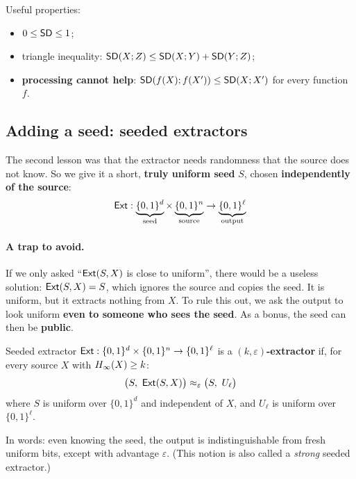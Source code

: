 Useful properties:
\begin{itemize}
  \item $0 \leq \mathsf{SD} \leq 1$;
  \item triangle inequality: $\mathsf{SD}(X; Z) \leq \mathsf{SD}(X; Y) + \mathsf{SD}(Y; Z)$;
  \item \textbf{processing cannot help}: $\mathsf{SD}(f(X); f(X')) \leq \mathsf{SD}(X; X')$ for every function $f$.
\end{itemize}

\subsection{Adding a seed: seeded extractors}\label{sec:seeded}

The second lesson was that the extractor needs randomness that the source does not know. So we give it a short, \textbf{truly uniform seed} $S$, chosen \textbf{independently of the source}:
\[
  \mathsf{Ext} : \underbrace{\{0,1\}^d}_{\text{seed}} \times \underbrace{\{0,1\}^n}_{\text{source}} \to \underbrace{\{0,1\}^\ell}_{\text{output}}
\]

\paragraph{A trap to avoid.} If we only asked ``$\mathsf{Ext}(S, X)$ is close to uniform'', there would be a useless solution: $\mathsf{Ext}(S, X) = S$, which ignores the source and copies the seed. It is uniform, but it extracts nothing from $X$. To rule this out, we ask the output to look uniform \textbf{even to someone who sees the seed}. As a bonus, the seed can then be \textbf{public}.

\begin{frameddefn}[label={def:extractor}]{Seeded extractor}
  $\mathsf{Ext} : \{0,1\}^d \times \{0,1\}^n \to \{0,1\}^\ell$ is a \textbf{$(k, \varepsilon)$-extractor} if, for every source $X$ with $H_\infty(X) \geq k$:
  \[
    \big(S,\ \mathsf{Ext}(S, X)\big) \approx_\varepsilon \big(S,\ U_\ell\big)
  \]
  where $S$ is uniform over $\{0,1\}^d$ and independent of $X$, and $U_\ell$ is uniform over $\{0,1\}^\ell$.
\end{frameddefn}

In words: even knowing the seed, the output is indistinguishable from fresh uniform bits, except with advantage $\varepsilon$. (This notion is also called a \textit{strong} seeded extractor.)

